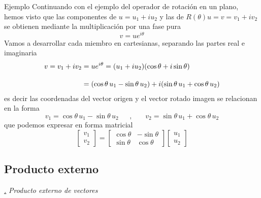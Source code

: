 \documentclass[a4paper,11pt]{book} %
\numberwithin{equation}{chapter}
\def\subsubiContadorIt{\par\addtocounter{subsubsection}{1}\underline{\it\thesubsubsection.}\hskip0.5cm \setcounter{subsubsubsectionIt}{0}}
\newcommand{\SubsubiIt}[1]{
		\subsubiContadorIt \textit{#1}
	}
\newcounter{subsubsubsectionIt}[subsubsection]
\begin{document}
	\begin{mybox_green}{Ejemplo}
	Continuando con el ejemplo del operador de rotación en un plano, hemos visto que las componentes de $u = u_1 + i u_2$ y las de $R(\theta)u = v = v_1 + i v_2$ se obtienen mediante la multiplicación por una fase pura 
		\begin{equation*}
		v= u e^{i\theta}
		\end{equation*}
Vamos a desarrollar cada miembro en cartesianas, separando las partes real e imaginaria
	\begin{align*}
	v = v_1 + i v_2 &= u e^{i\theta} =  (u_1 + iu_2) (\cos \theta + i \sin \theta)  \\
    \rule{0mm}{6mm}
    &= (\cos\theta \, u_1 - \sin \theta\,  u_2) + i(\sin\theta\,  u_1 + \cos \theta\,  u_2)
	\end{align*}	   
es decir las coordenadas del vector origen y el vector rotado imagen se relacionan en la  forma 
	\begin{equation*}
	v_1 = \cos\theta \, u_1 - \sin \theta\,  u_2 ~~~~~~~,~~~~~~~~
	v_2 = \sin\theta \, u_1 + \cos \theta\,  u_2     
	\end{equation*}
que podemos expresar en forma matricial
	\begin{equation*}
\begin{bmatrix} v_1 \\ v_2 \end{bmatrix} = \begin{bmatrix} \cos\theta & -\sin\theta \\ \sin\theta &\cos\theta\end{bmatrix} \begin{bmatrix} u_1 \\ u_2 \end{bmatrix}
	\end{equation*}
   
	\end{mybox_green}

		\subsection{Producto externo}




			\SubsubiIt{Producto externo de vectores}
\end{document}
